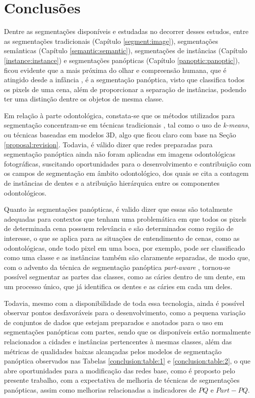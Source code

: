 \newpage
\clearpage
\section{Conclusões}
\label{final:final}

Dentre as segmentações disponíveis e estudadas no decorrer desses estudos, entre as segmentações tradicionais (Capítulo \ref{segment:image}), segmentações semânticas (Capítulo \ref{semantic:semantic}), segmentações de instâncias (Capítulo \ref{instance:instance}) e segmentações panópticas (Capítulo \ref{panoptic:panoptic}), ficou evidente que a mais próxima do olhar e compreensão humana, que é atingido desde a infância \cite{Mohan2020}, é a segmentação panóptica, visto que classifica todos os pixels de uma cena, além de proporcionar a separação de instâncias, podendo ter uma distinção dentre os objetos de mesma classe.

Em relação à parte odontológica, constata-se que os métodos utilizados para segmentação concentram-se em técnicas tradicionais \cite{Hammad2020}, tal como o uso de \textit{k-means}, ou técnicas baseadas em modelos 3D, algo que ficou claro com base na Seção \ref{proposal:revision}. Todavia, é válido dizer que redes preparadas para segmentação panóptica ainda não foram aplicadas em imagens odontológicas fotográficas, suscitando oportunidades para o desenvolvimento e contribuição com os campos de segmentação em âmbito odontológico, dos quais se cita a contagem de instâncias de dentes e a atribuição hierárquica entre os componentes odontológicos.

Quanto às segmentações panópticas, é valido dizer que essas são totalmente adequadas para contextos que tenham uma problemática em que todos os pixels de determinada cena possuem relevância e são determinados como região de interesse, o que se aplica para as situações de entendimento de cenas, como as odontológicas, onde todo pixel em uma boca, por exemplo, pode ser classificado como uma classe e as instâncias também são claramente separadas, de modo que, com o advento da técnica de segmentação panóptica \textit{part-aware} \cite{DeGeus2021}, tornou-se possível segmentar as partes das classes, como as cáries dentro de um dente, em um processo único, que já identifica os dentes e as cáries em cada um deles.

Todavia, mesmo com a disponibilidade de toda essa tecnologia, ainda é possível observar pontos desfavoráveis para o desenvolvimento, como a pequena variação de conjuntos de dados que estejam preparados e anotados para o uso em segmentações panópticas com partes, sendo que os disponíveis estão normalmente relacionados a cidades e instâncias pertencentes à mesmas classes, além das métricas de qualidades baixas alcançadas pelos modelos de segmentação panóptica observados nas Tabelas \ref{conclusion:table:1} e \ref{conclusion:table:2}, o que abre oportunidades para a modificação das redes base, como é proposto pelo presente trabalho, com a expectativa de melhoria de técnicas de segmentações panópticas, assim como melhorias relacionadas a indicadores de $PQ$ e $Part-PQ$.

